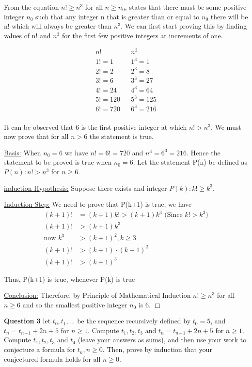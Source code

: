 \documentclass{article}
\begin{document}
\smallskip
From the equation $n! \geq {n^3}$ for all $n \geq {n_0}$, states that there must be some positive integer ${n_0}$ such that any integer n that is greater than or equal to ${n_0}$ there will be n! which will always be greater than ${n^3}$. We can first start proving this by finding values of n! and ${n^3}$ for the first few positive integers at increments of one.

\smallskip
\begin{align*}
n! && n^3\\
1!=1 && 1^3=1\\
2!=2 && 2^3=8\\
3!=6 && 3^3=27\\
4!=24 && 4^3=64\\
5!=120 && 5^3=125\\
6!=720 && 6^3=216\\
\end{align*}

It can be observed that 6 is the first positive integer at which $n!>n^3$. We must now prove that for all $n>6$ the statement is true.

\smallskip
\underline{Basis:} When ${n_0}=6$ we have $n!=6!=720$ and ${n^3}={6^3}=216$. Hence the statement to be proved is true when  ${n_0}=6$. Let the statement P(n) be defined as $P(n): n!>n^3$ for $n \geq 6$.

\smallskip
\underline{induction Hypothesis:} Suppose there exists and integer $P(k): k! \geq {k^3}$.

\smallskip
\underline{Induction Step:} We need to prove that P(k+1) is true, we have
\begin{equation*}
\begin{split}
    (k+1)! &= (k+1)k!>(k+1)k^3 \text{ (Since $k!>k^3$)}\\
    (k+1)! & >(k+1)k^3\\
    \text{now } k^3 & >(k+1)^2, k \geq 3\\
    (k+1)! & >(k+1)\cdot(k+1)^2\\
    (k+1)! & >(k+1)^3
\end{split}
\end{equation*}

Thus, P(k+1) is true, whenever P(k) is true

\smallskip
\underline{Conclusion:} Therefore, by Principle of Mathematical Induction $n! \geq {n^3}$ for all $n \geq 6$ and so the smallest positive integer ${n_0}$ is 6.
$\Box$

\bigskip
\bigskip
{\bf Question 3}
let ${t_0},{t_1},...$ be the sequence recursively defined by ${t_0}=5$, and 
${t_n}={t_n}{_-}{_1}+2n+5$ for $n \geq 1$. Compute ${t_1},{t_2},{t_3} \text{ and } {t_n}={t_n}{_-}{_1}+2n+5$ 
for $n \geq 1$. Compute ${t_1},{t_2},{t_3} \text{ and } {t_4}$ (leave your answers as sums), and then use your work to conjecture a formula for ${t_n},n \geq 0$. Then, prove by induction that your conjectured formula holds for all $n \geq 0$.
\end{document}
